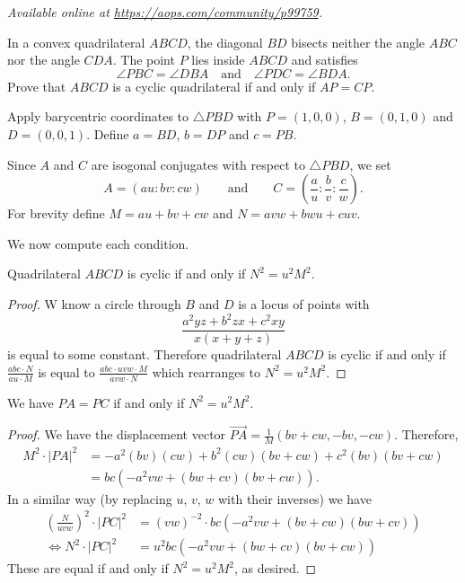 \textsl{Available online at \url{https://aops.com/community/p99759}.}
\begin{mdframed}[style=mdpurplebox,frametitle={Problem statement}]
In a convex quadrilateral $ABCD$,
the diagonal $BD$ bisects neither the angle $ABC$ nor the angle $CDA$.
The point $P$ lies inside $ABCD$ and satisfies
\[\angle PBC=\angle DBA \quad\text{and}\quad \angle PDC=\angle BDA. \]
Prove that $ABCD$ is a cyclic quadrilateral
if and only if $AP=CP$.
\end{mdframed}
Apply barycentric coordinates to $\triangle PBD$
with $P = (1,0,0)$, $B = (0,1,0)$ and $D = (0,0,1)$.
Define $a = BD$, $b = DP$ and $c = PB$.

Since $A$ and $C$ are isogonal conjugates with respect to $\triangle PBD$,
we set \[ A = (au : bv : cw) \qquad\text{and}\qquad
  C = \left( \frac au : \frac bv : \frac cw \right). \]
For brevity define $M = au + bv + cw$ and $N = avw + bwu + cuv$.

We now compute each condition.
\begin{claim*}
  Quadrilateral $ABCD$ is cyclic if and only if $N^2 = u^2 M^2$.
\end{claim*}
\begin{proof}
  W know a circle through $B$ and $D$
  is a locus of points
  with \[ \frac{a^2yz+b^2zx+c^2xy}{x(x+y+z)} \]
  is equal to some constant.
  Therefore quadrilateral $ABCD$ is cyclic if and only if
  $\frac{abc \cdot N}{au \cdot M}$
  is equal to $\frac{abc \cdot uvw \cdot M}{avw \cdot N}$
  which rearranges to $N^2 = u^2M^2$.
\end{proof}
\begin{claim*}
  We have $PA = PC$ if and only if $N^2 = u^2 M^2$.
\end{claim*}
\begin{proof}
  We have the displacement vector
  $\overrightarrow{PA}
  = \tfrac{1}{M} \left( bv+cw , -bv ,-cw \right)$.
  Therefore,
  \begin{align*}
    M^2 \cdot \left\lvert PA \right\rvert^2
    &= -a^2(bv)(cw) + b^2(cw)(bv+cw) + c^2(bv)(bv+cw) \\
    &= bc(-a^2vw + (bw+cv)(bv+cw)).
  \end{align*}
  In a similar way
  (by replacing $u$, $v$, $w$ with their inverses)
  we have
  \begin{align*}
    \left( \frac{N}{uvw} \right)^2 \cdot \left\lvert PC \right\rvert^2
    &= (vw)^{-2} \cdot bc(-a^2vw + (bv+cw)(bw+cv)) \\
    \iff N^2 \cdot \left\lvert PC \right\rvert^2
    & = u^2 bc(-a^2vw + (bw+cv)(bv+cw))
  \end{align*}
  These are equal if and only if $N^2 = u^2M^2$, as desired.
\end{proof}
\pagebreak